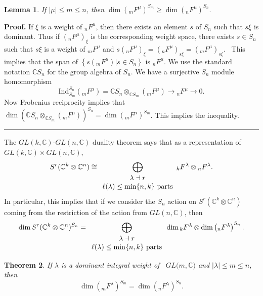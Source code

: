 \documentclass[12pt]{article}%
\newtheorem{theorem}{Theorem}
\newtheorem{lemma}[theorem]{Lemma}
\newenvironment{proof}[1][Proof]{\noindent\textbf{#1.} }{\ \rule{0.5em}{0.5em}}
\begin{document}
\begin{lemma}
\label{dimlemma} If $\left\vert \mu\right\vert \leq m\leq n$, then
$\dim\left(  {}_{m}F^{\mu}\right)  ^{S_{m}}\geq\dim\left(  {}_{n}F^{\mu
}\right)  ^{S_{n}}.$
\end{lemma}

\begin{proof}
If $\xi$ is a weight of $_{n}F^{\mu}$, then there exists an element $s$ of
$S_{n}$ such that $s\xi$ is dominant. Thus if $\left(  _{n}F^{\mu}\right)
_{\xi}$ is the corresponding weight space, there exists $s\in S_{n}$ such that
$s\xi$ is a weight of $_{m}F^{\mu}$ and $s\left(  _{n}F^{\mu}\right)  _{\xi
}=\left(  _{n}F^{\mu}\right)  _{s\xi}=\left(  _{m}F^{\mu}\right)  _{s\xi}$.
\ This implies that the span of $\left\{  s\left(  {}_{m}F^{\mu}\right)  |s\in
S_{n}\right\}  $ is $_{n}F^{\mu}$. We use the standard notation $\mathbb{C}%
S_{n}$ for the group algebra of $S_{n}$. We have a surjective $S_{n}$ module
homomorphism
\[
\mathrm{Ind}_{S_{m}}^{S_{n}}({}_{m}F^{\mu})=\mathbb{C}S_{n}\otimes
_{\mathbb{C}S_{m}}(_{{}m}F^{\mu})\rightarrow{}_{n}F^{\mu}\rightarrow0.
\]
Now Frobenius reciprocity implies that $\dim\left(  \mathbb{C}S_{n}%
\otimes_{\mathbb{C}S_{m}}(_{{}m}F^{\mu})\right)  ^{S_{n}}=\dim(_{{}m}F^{\mu
})^{S_{m}}$. This implies the inequality.
\end{proof}

The $GL(k,\mathbb{C})$-$GL(n,\mathbb{C})$ duality theorem says that as a
representation of $GL(k,\mathbb{C})\times GL(n,\mathbb{C})$,
\[
S^{r}(\mathbb{C}^{k}\otimes\mathbb{C}^{n})\cong%
{\displaystyle\bigoplus_{%
\begin{array}
[c]{c}%
\lambda\dashv r\\
\ell(\lambda) \leq\min\{n,k\}\mathrm{\ parts}%
\end{array}
}}
{}_{k}F^{\lambda}\otimes{}_{n}F^{\lambda}.
\]
In particular, this implies that if we consider the $S_{n}$ action on
$S^{r}(\mathbb{C}^{k}\otimes\mathbb{C}^{n})$ coming from the restriction of
the action from $GL(n,\mathbb{C})$, then%
\[
\dim S^{r}(\mathbb{C}^{k}\otimes\mathbb{C}^{n})^{S_{n}}=%
{\displaystyle\bigoplus_{%
\begin{array}
[c]{c}%
\lambda\dashv r\\
\ell(\lambda) \leq\min\{n,k\}\mathrm{\ parts}%
\end{array}
}}
\dim{}_{k}F^{\lambda}\otimes\dim\left(  {}_{n}F^{\lambda}\right)  ^{S_{n}}.
\]


\begin{theorem}
\label{Weyl-stability}If $\lambda$ is a dominant integral weight of
\ $GL(m,\mathbb{C)}$ and $\left\vert \lambda\right\vert \leq m\leq n$, then
\[
\dim\left(  {}_{m}F^{\lambda}\right)  ^{S_{m}}=\dim\left(  {}_{n}F^{\lambda
}\right)  ^{S_{n}}.
\]

\end{theorem}
\end{document}
